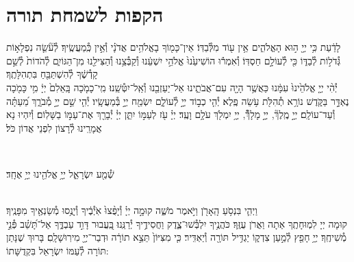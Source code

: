 \documentclass[twoside, openany, parskip=half, 11pt]{book}
\begin{document}
\chapter[הקפות לשמחת תורה]{ הקפות לשמחת תורה }


לָדַ֔עַת כִּ֥י יְיָ֖ ה֣וּא הָאֱלֹהִ֑ים אֵ֥ין ע֖וֹד מִלְּ֯בַדּֽוֹ׃ \hfill \break
אֵין־כָּמ֖וֹךָ בָאֱלֹהִ֥ים אֲדֹנָ֗י וְ֯אֵ֣ין כְּֽ֯מַעֲשֶֽׂיךָ׃ \hfill \break
לְ֯עֹ֘שֵׂ֤ה נִפְלָא֣וֹת גְּ֯דֹל֣וֹת לְ֯בַדּ֑וֹ כִּ֖י לְ֯עוֹלָ֣ם חַסְדּֽוֹ׃ \hfill \break
וְ֯אִמְר֕וּ הוֹשִׁיעֵ֙נוּ֙ אֱלֹהֵ֣י יִשְׁעֵ֔נוּ וְ֯קַבְּ֯צֵ֥נוּ וְ֯הַצִּילֵ֖נוּ מִן־הַגּוֹיִ֑ם לְ֯הֹדוֹת֙ לְ֯שֵׁ֣ם קָדְ֯שֶׁ֔ךָ לְ֯הִשְׁתַּבֵּ֖חַ בִּתְהִלָּתֶֽךָ׃\\
יְ֯הִ֨י יְיָ֤ אֱלֹהֵ֙ינוּ֙ עִמָּ֔נוּ כַּאֲשֶׁ֥ר הָיָ֖ה עִם־אֲבֹתֵ֑ינוּ אַל־יַעַזְבֵ֖נוּ וְ֯אַֽל־יִטְּ֯שֵֽׁנוּ׃ \hfill \break
מִֽי־כָמֹ֤כָה בָּֽאֵלִם֙ יְיָ֔ מִ֥י כָּמֹ֖כָה נֶאְדָּ֣ר בַּקֹּ֑דֶשׁ נוֹרָ֥א תְ֯הִלֹּ֖ת עֹ֥שֵׂה פֶֽלֶא׃ \hfill \break
יְ֯הִ֤י כְב֣וֹד יְיָ֣ לְ֯עוֹלָ֑ם יִשְׂמַ֖ח יְיָ֣ בְּ֯מַעֲשָֽׂיו׃ \hfill \break
יְ֯הִ֤י שֵׁ֣ם יְיָ֣ מְ֯בֹרָ֑ךְ מֵ֝עַתָּ֗ה וְ֯עַד־עוֹלָֽם׃ \hfill \break
יְיָ֣ מֶֽלֶךְ֘, יְיָ֣ מָלָךְ֯֘, יְיָ֥ יִמְלֹ֖ךְ עֹלָ֥ם וָעֶֽד׃ \hfill \break
יְיָ֗ עֹ֖ז לְעַמּ֣וֹ יִתֵּ֑ן יְיָ֓ יְ֯בָרֵ֖ךְ אֶת־עַמּ֣וֹ בַשָּׁלֽוֹם׃ \hfill \break
וְ֯יִהְיוּ נָא אֲמָרֵֽינוּ לְ֯רָצוֹן לִפְנֵי אֲדוֹן כֹּל׃ \hfill \break

\vspace{-1.3\baselineskip}

\\
\begin{large}
שְׁ֯מַ֖ע יִשְׂרָאֵ֑ל יְיָ֥ אֱלֹהֵ֖ינוּ יְיָ֥ אֶחָֽד׃
\end{large}

\\
וַיְהִ֛י בִּנְסֹ֥עַ הָֽאָרֹ֖ן וַיֹּ֣אמֶר מֹשֶׁ֑ה קוּמָ֣ה יְיָ֗ וְ֯יָפֻ֨צוּ֙ אֹֽיְ֯בֶ֔יךָ וְ֯יָנֻ֥סוּ מְ֯שַׂנְאֶ֖יךָ מִפָּנֶֽיךָ׃\\
קוּמָה יְיָ לִמְוּחָתֶֽךָ אַתָה וַאֲרֹן עֻזֶּֽךָ׃ \hfill \break
כֹּהֲנֶ֥יךָ יִלְבְּ֯שׁוּ־צֶ֑דֶק וַחֲסִידֶ֥יךָ יְ֯רַנֵּֽנוּ׃ \hfill \break
בַּֽ֭עֲבוּר דָּוִ֣ד עַבְדֶּ֑ךָ אַל־תָּ֝שֵׁ֗ב פְּ֯נֵ֣י מְ֯שִׁיחֶֽךָ׃ \hfill \break
יְיָ֥ חָפֵ֖ץ לְ֯מַ֣עַן צִדְק֑וֹ יַגְדִּ֥יל תּוֹרָ֖ה וְ֯יַאְדִּֽיר׃ \hfill \break
כִּ֤י מִצִּיּוֹן֙ תֵּצֵ֣א תוֹרָ֔ה וּדְבַר־יְיָ֖ מִירֽוּשָׁלָֽםִ׃ \hfill \break
בָּרוּךְ שֶׁנָּתַן תּוֹרָה לְ֯עַמּוֹ יִשְׂרָאֵל בִּקְדֻשָּׁתוֹ: \hfill \break
\end{document}
